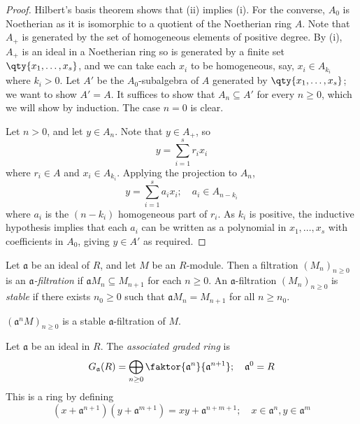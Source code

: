 \begin{proof}
    Hilbert's basis theorem shows that (ii) implies (i).
    For the converse, \( A_0 \) is Noetherian as it is isomorphic to a quotient of the Noetherian ring \( A \).
    Note that \( A_+ \) is generated by the set of homogeneous elements of positive degree.
    By (i), \( A_+ \) is an ideal in a Noetherian ring so is generated by a finite set \( \qty{x_1, \dots, x_s} \), and we can take each \( x_i \) to be homogeneous, say, \( x_i \in A_{k_i} \) where \( k_i > 0 \).
    Let \( A' \) be the \( A_0 \)-subalgebra of \( A \) generated by \( \qty{x_1, \dots, x_s} \); we want to show \( A' = A \).
    It suffices to show that \( A_n \subseteq A' \) for every \( n \geq 0 \), which we will show by induction.
    The case \( n = 0 \) is clear.

    Let \( n > 0 \), and let \( y \in A_n \).
    Note that \( y \in A_+ \), so
    \[ y = \sum_{i=1}^s r_i x_i \]
    where \( r_i \in A \) and \( x_i \in A_{k_i} \).
    Applying the projection to \( A_n \),
    \[ y = \sum_{i=1}^s a_i x_i;\quad a_i \in A_{n-k_i} \]
    where \( a_i \) is the \( (n-k_i) \) homogeneous part of \( r_i \).
    As \( k_i \) is positive, the inductive hypothesis implies that each \( a_i \) can be written as a polynomial in \( x_1, \dots, x_s \) with coefficients in \( A_0 \), giving \( y \in A' \) as required.
\end{proof}
\begin{definition}
    Let \( \mathfrak a \) be an ideal of \( R \), and let \( M \) be an \( R \)-module.
    Then a filtration \( (M_n)_{n \geq 0} \) is an \emph{\( \mathfrak a \)-filtration} if \( \mathfrak a M_n \subseteq M_{n+1} \) for each \( n \geq 0 \).
    An \( \mathfrak a \)-filtration \( (M_n)_{n \geq 0} \) is \emph{stable} if there exists \( n_0 \geq 0 \) such that \( \mathfrak a M_n = M_{n+1} \) for all \( n \geq n_0 \).
\end{definition}
\begin{example}
    \( (\mathfrak a^n M)_{n \geq 0} \) is a stable \( \mathfrak a \)-filtration of \( M \).
\end{example}
\begin{definition}
    Let \( \mathfrak a \) be an ideal in \( R \).
    The \emph{associated graded ring} is
    \[ G_{\mathfrak a}(R) = \bigoplus_{n \geq 0} \faktor{\mathfrak a^n}{\mathfrak a^{n+1}};\quad \mathfrak a^0 = R \]
    This is a ring by defining
    \[ (x + \mathfrak a^{n+1})(y + \mathfrak a^{m+1}) = xy + \mathfrak a^{n + m + 1};\quad x \in \mathfrak a^n, y \in \mathfrak a^m \]
\end{definition}
